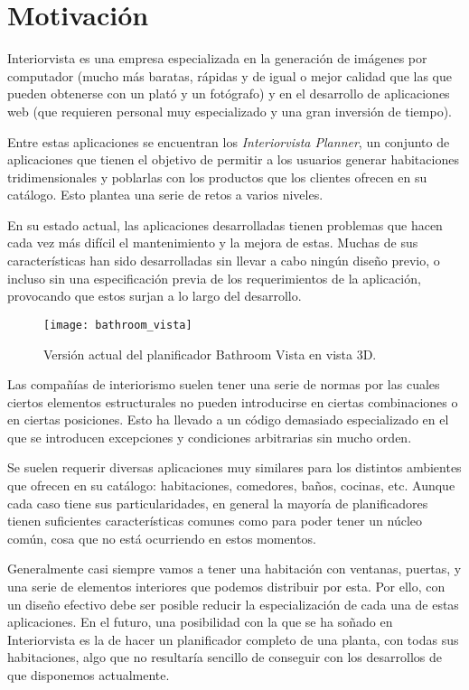 \section{Motivación}
Interiorvista es una empresa especializada en la generación de imágenes por computador (mucho más baratas, rápidas y de igual o mejor calidad que las que pueden obtenerse con un plató y un fotógrafo) y en el desarrollo de aplicaciones web (que requieren personal muy especializado y una gran inversión de tiempo).

Entre estas aplicaciones se encuentran los \textit{Interiorvista Planner}, un conjunto de aplicaciones que tienen el objetivo de permitir a los usuarios generar habitaciones tridimensionales y poblarlas con los productos que los clientes ofrecen en su catálogo. Esto plantea una serie de retos a varios niveles.

En su estado actual, las aplicaciones desarrolladas tienen problemas que hacen cada vez más difícil el mantenimiento y la mejora de estas. Muchas de sus características han sido desarrolladas sin llevar a cabo ningún diseño previo, o incluso sin una especificación previa de los requerimientos de la aplicación, provocando que estos surjan a lo largo del desarrollo.

\begin{figure}[H]
    \centering
    \texttt{[image: bathroom\_vista]}
    \caption{Versión actual del planificador Bathroom Vista en vista 3D.}
    \label{fig:bathroom_vista}
\end{figure}


Las compañías de interiorismo suelen tener una serie de normas por las cuales ciertos elementos estructurales no pueden introducirse en ciertas combinaciones o en ciertas posiciones. Esto ha llevado a un código demasiado especializado en el que se introducen excepciones y condiciones arbitrarias sin mucho orden.

Se suelen requerir diversas aplicaciones muy similares para los distintos ambientes que ofrecen en su catálogo: habitaciones, comedores, baños, cocinas, etc. Aunque cada caso tiene sus particularidades, en general la mayoría de planificadores tienen suficientes características comunes como para poder tener un núcleo común, cosa que no está ocurriendo en estos momentos.

Generalmente casi siempre vamos a tener una habitación con ventanas, puertas, y una serie de elementos interiores que podemos distribuir por esta. Por ello, con un diseño efectivo debe ser posible reducir la especialización de cada una de estas aplicaciones. En el futuro, una posibilidad con la que se ha soñado en Interiorvista es la de hacer un planificador completo de una planta, con todas sus habitaciones, algo que no resultaría sencillo de conseguir con los desarrollos de que disponemos actualmente.

